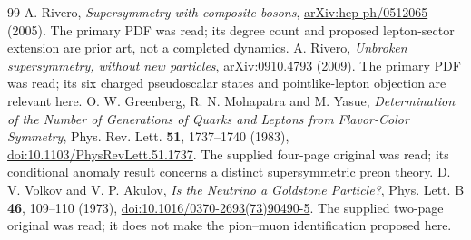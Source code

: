 \documentclass[11pt]{article}
\begin{document}
\begin{thebibliography}{99}
 A. Rivero, \emph{Supersymmetry with composite bosons},
\href{https://arxiv.org/abs/hep-ph/0512065}{arXiv:hep-ph/0512065} (2005).
The primary PDF was read; its degree count and proposed lepton-sector extension are prior art, not a completed dynamics.
 A. Rivero, \emph{Unbroken supersymmetry, without new particles},
\href{https://arxiv.org/abs/0910.4793}{arXiv:0910.4793} (2009).
The primary PDF was read; its six charged pseudoscalar states and pointlike-lepton objection are relevant here.
 O. W. Greenberg, R. N. Mohapatra and M. Yasue,
\emph{Determination of the Number of Generations of Quarks and Leptons from Flavor-Color Symmetry},
Phys. Rev. Lett. \textbf{51}, 1737--1740 (1983),
\href{https://doi.org/10.1103/PhysRevLett.51.1737}{doi:10.1103/PhysRevLett.51.1737}.
The supplied four-page original was read; its conditional anomaly result concerns a distinct supersymmetric preon theory.
 D. V. Volkov and V. P. Akulov,
\emph{Is the Neutrino a Goldstone Particle?}, Phys. Lett. B \textbf{46}, 109--110 (1973),
\href{https://doi.org/10.1016/0370-2693(73)90490-5}{doi:10.1016/0370-2693(73)90490-5}.
The supplied two-page original was read; it does not make the pion--muon identification proposed here.
\end{thebibliography}
\end{document}
